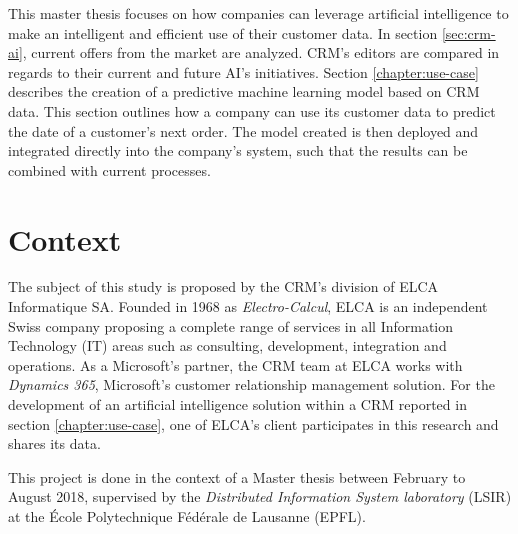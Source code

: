 This master thesis focuses on how companies can leverage artificial intelligence to make an intelligent and efficient use of their customer data. In section \ref{sec:crm-ai}, current offers from the market are analyzed. CRM's editors are compared in regards to their current and future AI's initiatives. Section \ref{chapter:use-case} describes the creation of a predictive machine learning model based on CRM data. This section outlines how a company can use its customer data to predict the date of a customer's next order. The model created is then deployed and integrated directly into the company's system, such that the results can be combined with current processes.

\section{Context}
The subject of this study is proposed by the CRM's division of ELCA Informatique SA. Founded in 1968 as \textit{Electro-Calcul}, ELCA is an independent Swiss company proposing a complete range of services in all Information Technology (IT) areas such as consulting, development, integration and operations. As a Microsoft's partner, the CRM team at ELCA works with \textit{Dynamics 365}, Microsoft's customer relationship management solution.
For the development of an artificial intelligence solution within a CRM reported in section \ref{chapter:use-case}, one of ELCA's client participates in this research and shares its data.

This project is done in the context of a Master thesis between February to August 2018, supervised by the \textit{Distributed Information System laboratory} (LSIR) at the École Polytechnique Fédérale de Lausanne (EPFL).